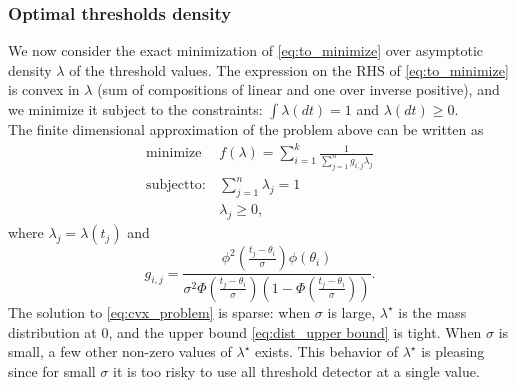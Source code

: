 \documentclass[letterpaper, conference]{IEEEtran}      %
\begin{document}
\subsubsection{Optimal thresholds density}
We now consider the exact minimization of \eqref{eq:to_minimize} over asymptotic density $\lambda$ of the threshold values. The expression on the RHS of \eqref{eq:to_minimize} is convex in $\lambda$ (sum of compositions of linear and one over inverse positive), and we minimize it subject to the constraints: $\int \lambda(dt) = 1$ and $\lambda(dt)\geq0$. \\

The finite dimensional approximation of the problem above can be written as
\begin{align}
\mathrm{minimize}\, & f(\lambda) = \sum_{i=1}^k \frac{1}{ \sum_{j=1}^n g_{i,j} \lambda_j }  \label{eq:cvx_problem}\\
\mathrm{subject to:} & \sum_{j=1}^n {\lambda_j} =1   \nonumber 
\\ & \lambda_j \geq 0, \nonumber 
\end{align}
where $\lambda_j = \lambda(t_j)$ and
\[
g_{i,j} = \frac {\phi^2( \frac{t_j - \theta_i}{\sigma}) \phi(\theta_i)} { \sigma^2 \Phi( \frac{t_j - \theta_i}{\sigma} ) \left( 1-\Phi( \frac{t_j - \theta_i}{\sigma}) \right)}.
\]
The solution to \eqref{eq:cvx_problem} is sparse: when $\sigma$ is large, $\lambda^\star$ is the mass distribution at $0$, and the upper bound \eqref{eq:dist_upper bound} is tight. When $\sigma$ is small, a few other non-zero values of $\lambda^\star$ exists. This behavior of $\lambda^\star$ is pleasing since for small $\sigma$ it is too risky to use all threshold detector at a single value. 





\end{document}
